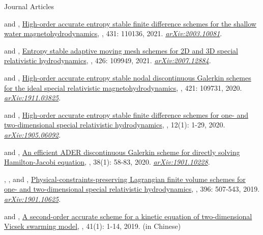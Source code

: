 \begin{cvpublicationsection}{Journal Articles}
%
\item[\pubenum]  and , \href{https://doi.org/10.1016/j.jcp.2021.110136}{High-order accurate entropy stable finite difference schemes for the shallow water magnetohydrodynamics}, , 431: 110136, 2021. \href{https://arxiv.org/abs/2003.10081}{\em arXiv:2003.10081}.
%
\item[\pubenum]  and , \href{https://doi.org/10.1016/j.jcp.2020.109949}{Entropy stable adaptive moving mesh schemes for 2D and 3D special relativistic hydrodynamics}, , 426: 109949, 2021. \href{https://arxiv.org/abs/2007.12884}{\em arXiv:2007.12884}.
%
\item[\pubenum]  and , \href{https://doi.org/10.1016/j.jcp.2020.109731}{High-order accurate entropy stable nodal discontinuous Galerkin schemes for the ideal special relativistic magnetohydrodynamics}, , 421: 109731, 2020. \href{https://arxiv.org/abs/1911.03825}{\em arXiv:1911.03825}.
%
\item[\pubenum]  and , \href{https://doi.org/10.4208/aamm.OA-2019-0124}{High-order accurate entropy stable finite difference schemes for one- and two-dimensional special relativistic hydrodynamics}, , 12(1): 1-29, 2020. \href{https://arxiv.org/abs/1905.06092}{\em arXiv:1905.06092}.
%
\item[\pubenum]  and , \href{https://doi.org/10.4208/jcm.1902-m2018-0189}{An efficient ADER discontinuous Galerkin scheme for directly solving Hamilton-Jacobi equation}, , 38(1): 58-83, 2020. \href{https://arxiv.org/abs/1901.10228}{\em arXiv:1901.10228}.
%
\item[\pubenum] , , and , \href{https://doi.org/10.1016/j.jcp.2019.06.055}{Physical-constraints-preserving Lagrangian finite volume schemes for one- and two-dimensional special relativistic hydrodynamics}, , 396: 507-543, 2019. \href{https://arxiv.org/abs/1901.10625}{\em arXiv:1901.10625}.
%
\item[\pubenum]  and , \href{http://www.jxtu.net/xtdxxbzr/ch/reader/view_abstract.aspx?file_no=201901001&flag=1}{A second-order accurate scheme for a kinetic equation of two-dimensional Vicsek swarming model}, , 41(1): 1-14, 2019. (in Chinese)

\end{cvpublicationsection}
